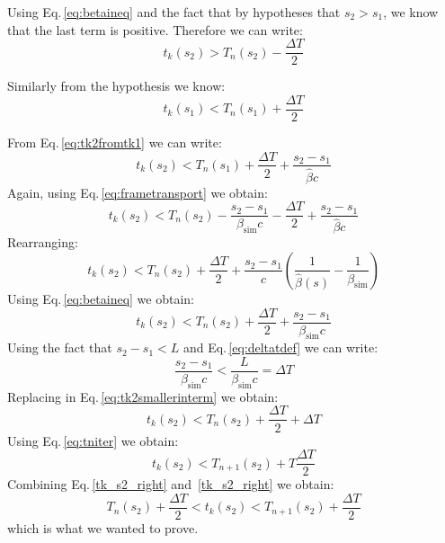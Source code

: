 Using Eq.\,\ref{eq:betaineq} and the fact that by hypotheses that $s_2 > s_1$, we know that the last term is positive. Therefore we can write:
\begin{equation}
t_k(s_2) > T_n(s_2) - \frac{\Delta T}{2}
\label{tk_s2_right}
\end{equation}

Similarly from the hypothesis we know:
\begin{equation}
t_k(s_1) < T_n(s_1) + \frac{\Delta T}{2}
\end{equation}

From Eq.\,\ref{eq:tk2fromtk1} we can write:
\begin{equation}
t_k(s_2) < T_n(s_1) + \frac{\Delta T}{2} + \frac{s_2 - s_1}{\hat{\beta} c} 
\end{equation}
Again, using Eq.\,\ref{eq:frametransport} we obtain:
\begin{equation}
t_k(s_2) < T_n(s_2) - \frac{s_2 - s_1}{{\beta}_\text{sim} c}  - \frac{\Delta T}{2} + \frac{s_2 - s_1}{\hat{\beta} c} 
\end{equation}
Rearranging:
\begin{equation}
t_k(s_2) < T_n(s_2) + \frac{\Delta T}{2} + \frac{s_2 - s_1}{c} \left(
\frac{1}{\hat{\beta}(s)} - \frac{1}{\beta_\text{sim}}
\right)
\end{equation}
Using Eq.\,\ref{eq:betaineq} we obtain:
\begin{equation}
t_k(s_2) < T_n(s_2) + \frac{\Delta T}{2} + \frac{s_2 - s_1}{\beta_\text{sim}c}
\label{eq:tk2smallerinterm}
\end{equation}
Using the fact that $s_2 - s_1 < L$ and Eq.\,\ref{eq:deltatdef} we can write:
\begin{equation}
\frac{s_2 - s_1}{\beta_\text{sim}c} < \frac{L}{\beta_\text{sim}c} = \Delta T
\end{equation}
Replacing in Eq.\,\ref{eq:tk2smallerinterm} we obtain:
\begin{equation}
t_k(s_2) < T_n(s_2) + \frac{\Delta T}{2} + \Delta T
\end{equation}
Using Eq.\,\ref{eq:tniter} we obtain:
\begin{equation}
t_k(s_2) < T_{n+1}(s_2) + T\frac{\Delta T}{2}
\label{tk_s2_left}
\end{equation}
Combining Eq.\,\ref{tk_s2_right} and~\ref{tk_s2_right} we obtain:
\begin{equation}
T_{n}(s_2) + \frac{\Delta T}{2} < t_k(s_2) < T_{n+1}(s_2) + \frac{\Delta T}{2}
\label{tk_s2_left}
\end{equation}
which is what we wanted to prove.

